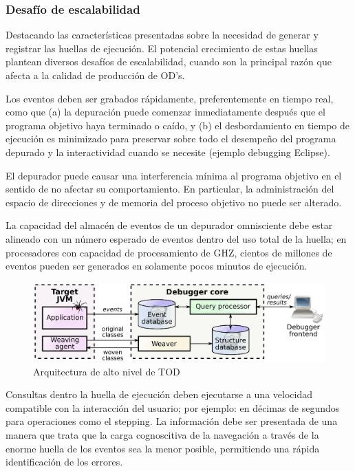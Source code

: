 \documentclass[12pt,legalpaper]{report}
\begin{document}
			\subsubsection{Desafío de escalabilidad \label{escalabilidad}}

Destacando las características presentadas sobre la necesidad de generar y registrar las huellas de ejecución.  El potencial crecimiento de estas huellas plantean diversos desafíos de escalabilidad, cuando son la principal razón que afecta a la calidad de producción de OD's.

Los eventos deben ser grabados rápidamente, preferentemente en tiempo real, como que (a) la depuración puede comenzar inmediatamente después que el programa objetivo haya terminado o caído, y (b) el desbordamiento en tiempo de ejecución es minimizado para preservar sobre todo el desempeño del programa depurado y la interactividad cuando se necesite (ejemplo debugging Eclipse).

El depurador puede causar una interferencia mínima al programa objetivo en el sentido de no afectar su comportamiento.  En particular, la administración del espacio de direcciones y de memoria del proceso objetivo no puede ser alterado.

La capacidad del almacén de eventos de un depurador omnisciente debe estar alineado con un número esperado de eventos dentro del uso total de la huella; en procesadores con capacidad de procesamiento de GHZ, cientos de millones de eventos pueden ser generados en solamente pocos minutos de ejecución.

\begin{figure}[hpb]
	\centering
	\includegraphics[scale=0.5]{images/TOD/TODArchitecture.eps}
	\caption{Arquitectura de alto nivel de TOD}
	\label{TODArchitecture}
\end{figure}

Consultas dentro la huella de ejecución deben ejecutarse a una velocidad compatible con la interacción del usuario; por ejemplo: en décimas de segundos para operaciones como el stepping.
La información debe ser presentada de una manera que trata que la carga cognoscitiva de la navegación a través de la enorme huella de los eventos sea la menor posible, permitiendo una rápida identificación de los errores.
\end{document}
